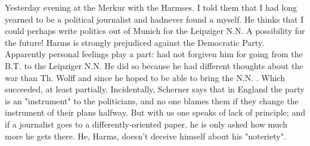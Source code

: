 
\missing

Yesterday evening at the Merkur with the Harmses. I told them that I had long yearned to be a political journalist and hadnever found a  myself. He thinks that I could perhaps write politics out of Munich for the Leipziger N.N. A possibility for the future! Harms is strongly prejudiced against the Democratic Party. Apparently personal feelings play a part:  had not forgiven him for going from the B.T. to the Leipziger N.N. He did so because he had different thoughts about the war than Th. Wolff and since he hoped to be able to bring the N.N. . Which succeeded, at least partially. Incidentally, Scherner says that in England the party is an "instrument" to the 
politicians, and no one blames them if they change the instrument of their plans halfway. But with us one speaks of lack of principle; and if a journalist goes to a differently-oriented paper, he is only asked how much more he gets there. He, Harms, doesn't deceive himself about his "noteriety".

\missing


